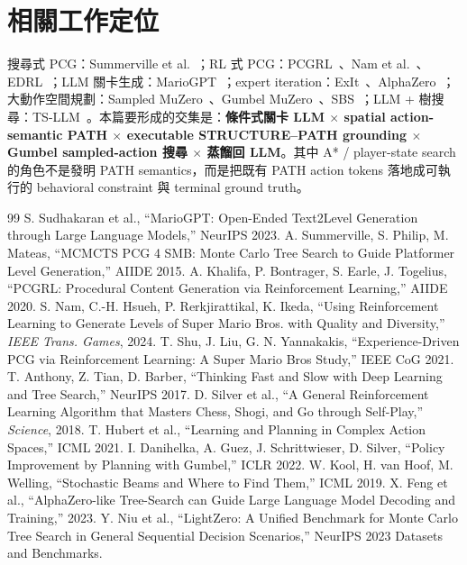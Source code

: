\documentclass[11pt,a4paper]{article}
\begin{document}
\section{相關工作定位}
搜尋式 PCG：Summerville et al.~\cite{summerville2015}；RL 式 PCG：PCGRL~\cite{khalifa2020}、Nam et al.~\cite{nam2024}、EDRL~\cite{shu2021}；LLM 關卡生成：MarioGPT~\cite{sudhakaran2023}；expert iteration：ExIt~\cite{anthony2017}、AlphaZero~\cite{silver2018}；大動作空間規劃：Sampled MuZero~\cite{hubert2021}、Gumbel MuZero~\cite{danihelka2022}、SBS~\cite{kool2019}；LLM + 樹搜尋：TS-LLM~\cite{feng2023}。本篇要形成的交集是：\textbf{條件式關卡 LLM $\times$ spatial action-semantic PATH $\times$ executable STRUCTURE--PATH grounding $\times$ Gumbel sampled-action 搜尋 $\times$ 蒸餾回 LLM}。其中 A* / player-state search 的角色不是發明 PATH semantics，而是把既有 PATH action tokens 落地成可執行的 behavioral constraint 與 terminal ground truth。

\begin{thebibliography}{99}\small
{} S. Sudhakaran et al., ``MarioGPT: Open-Ended Text2Level Generation through Large Language Models,'' NeurIPS 2023.
 A. Summerville, S. Philip, M. Mateas, ``MCMCTS PCG 4 SMB: Monte Carlo Tree Search to Guide Platformer Level Generation,'' AIIDE 2015.
 A. Khalifa, P. Bontrager, S. Earle, J. Togelius, ``PCGRL: Procedural Content Generation via Reinforcement Learning,'' AIIDE 2020.
 S. Nam, C.-H. Hsueh, P. Rerkjirattikal, K. Ikeda, ``Using Reinforcement Learning to Generate Levels of Super Mario Bros. with Quality and Diversity,'' \emph{IEEE Trans. Games}, 2024.
 T. Shu, J. Liu, G. N. Yannakakis, ``Experience-Driven PCG via Reinforcement Learning: A Super Mario Bros Study,'' IEEE CoG 2021.
 T. Anthony, Z. Tian, D. Barber, ``Thinking Fast and Slow with Deep Learning and Tree Search,'' NeurIPS 2017.
 D. Silver et al., ``A General Reinforcement Learning Algorithm that Masters Chess, Shogi, and Go through Self-Play,'' \emph{Science}, 2018.
 T. Hubert et al., ``Learning and Planning in Complex Action Spaces,'' ICML 2021.
 I. Danihelka, A. Guez, J. Schrittwieser, D. Silver, ``Policy Improvement by Planning with Gumbel,'' ICLR 2022.
 W. Kool, H. van Hoof, M. Welling, ``Stochastic Beams and Where to Find Them,'' ICML 2019.
 X. Feng et al., ``AlphaZero-like Tree-Search can Guide Large Language Model Decoding and Training,'' 2023.
 Y. Niu et al., ``LightZero: A Unified Benchmark for Monte Carlo Tree Search in General Sequential Decision Scenarios,'' NeurIPS 2023 Datasets and Benchmarks.
\end{thebibliography}
\end{document}
